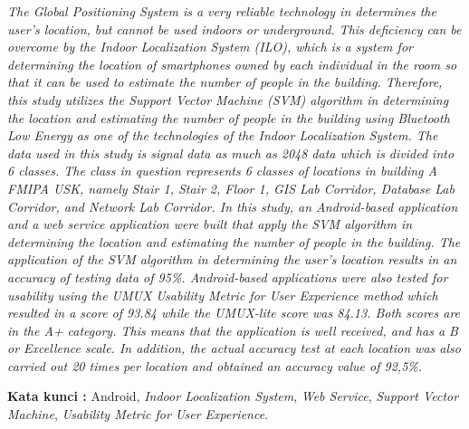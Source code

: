 \begin{abstracteng}

    \textit{The Global Positioning System is a very reliable technology in
        determines the user's location, but cannot be used indoors or underground. This deficiency can be overcome by the Indoor Localization System (ILO), which is a system for determining the location of smartphones owned by each individual in the room so that it can be used to estimate the number of people in the building. Therefore, this study utilizes the Support Vector Machine (SVM) algorithm in determining the location and estimating the number of people in the building using Bluetooth Low Energy as one of the technologies of the Indoor Localization System. The data used in this study is signal data as much as 2048 data which is divided into 6 classes. The class in question represents 6 classes of locations in building A FMIPA USK, namely Stair 1, Stair 2, Floor 1, GIS Lab Corridor, Database Lab Corridor, and Network Lab Corridor. In this study, an Android-based application and a web service application were built that apply the SVM algorithm in determining the location and estimating the number of people in the building. The application of the SVM algorithm in determining the user's location results in an accuracy of testing data of 95\%. Android-based applications were also tested for usability using the UMUX Usability Metric for User Experience method which resulted in a score of 93.84 while the UMUX-lite score was 84.13. Both scores are in the A+ category. This means that the application is well received, and has a B or Excellence scale. In addition, the actual accuracy test at each location was also carried out 20 times per location and obtained an accuracy value of 92,5\%.}


    \bigskip
    \noindent
    \textbf{Kata kunci :} Android, \textit{Indoor Localization System}, \textit{Web Service}, \textit{Support Vector Machine}, \textit{Usability Metric for User Experience}.
\end{abstracteng}